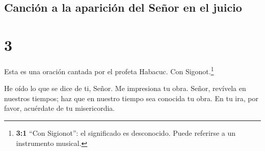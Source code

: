 \hypertarget{canciuxf3n-a-la-apariciuxf3n-del-seuxf1or-en-el-juicio}{%
\subsection{Canción a la aparición del Señor en el
juicio}\label{canciuxf3n-a-la-apariciuxf3n-del-seuxf1or-en-el-juicio}}

\hypertarget{section-2}{%
\section{3}\label{section-2}}

 Esta es una oración cantada por el profeta Habacuc. Con
Sigonot.\footnote{\textbf{3:1} ``Con Sigionot'': el significado es
  desconocido. Puede referirse a un instrumento musical.}

 He oído lo que se dice de ti, Señor. Me impresiona tu
obra. Señor, revívela en nuestros tiempos; haz que en nuestro tiempo sea
conocida tu obra. En tu ira, por favor, acuérdate de tu misericordia.

